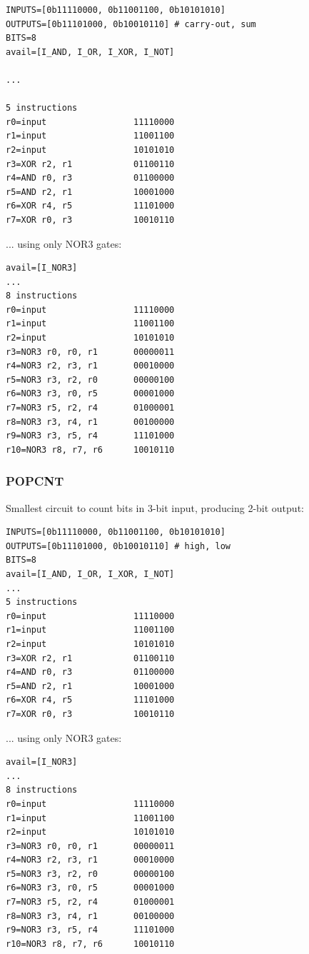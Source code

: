 \begin{lstlisting}
INPUTS=[0b11110000, 0b11001100, 0b10101010]
OUTPUTS=[0b11101000, 0b10010110] # carry-out, sum
BITS=8
avail=[I_AND, I_OR, I_XOR, I_NOT]

...

5 instructions
r0=input                 11110000
r1=input                 11001100
r2=input                 10101010
r3=XOR r2, r1            01100110
r4=AND r0, r3            01100000
r5=AND r2, r1            10001000
r6=XOR r4, r5            11101000
r7=XOR r0, r3            10010110
\end{lstlisting}

... using only NOR3 gates:

\begin{lstlisting}
avail=[I_NOR3]
...
8 instructions
r0=input                 11110000
r1=input                 11001100
r2=input                 10101010
r3=NOR3 r0, r0, r1       00000011
r4=NOR3 r2, r3, r1       00010000
r5=NOR3 r3, r2, r0       00000100
r6=NOR3 r3, r0, r5       00001000
r7=NOR3 r5, r2, r4       01000001
r8=NOR3 r3, r4, r1       00100000
r9=NOR3 r3, r5, r4       11101000
r10=NOR3 r8, r7, r6      10010110
\end{lstlisting}

\subsubsection{POPCNT}

Smallest circuit to count bits in 3-bit input, producing 2-bit output:

\begin{lstlisting}
INPUTS=[0b11110000, 0b11001100, 0b10101010]
OUTPUTS=[0b11101000, 0b10010110] # high, low
BITS=8
avail=[I_AND, I_OR, I_XOR, I_NOT]
...
5 instructions
r0=input                 11110000
r1=input                 11001100
r2=input                 10101010
r3=XOR r2, r1            01100110
r4=AND r0, r3            01100000
r5=AND r2, r1            10001000
r6=XOR r4, r5            11101000
r7=XOR r0, r3            10010110
\end{lstlisting}

... using only NOR3 gates:

\begin{lstlisting}
avail=[I_NOR3]
...
8 instructions
r0=input                 11110000
r1=input                 11001100
r2=input                 10101010
r3=NOR3 r0, r0, r1       00000011
r4=NOR3 r2, r3, r1       00010000
r5=NOR3 r3, r2, r0       00000100
r6=NOR3 r3, r0, r5       00001000
r7=NOR3 r5, r2, r4       01000001
r8=NOR3 r3, r4, r1       00100000
r9=NOR3 r3, r5, r4       11101000
r10=NOR3 r8, r7, r6      10010110
\end{lstlisting}

